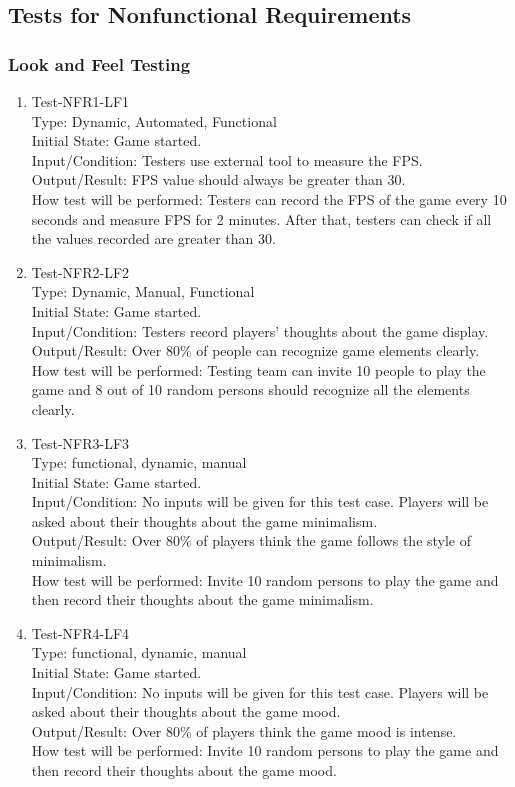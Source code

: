 \documentclass[12pt]{article}
\begin{document}
\subsection{Tests for Nonfunctional Requirements}
\subsubsection{Look and Feel Testing}
\begin{enumerate}[1.]
\item Test-NFR1-LF1\\
Type: Dynamic, Automated, Functional\\
Initial State: Game started.\\
Input/Condition: Testers use external tool to measure
 the FPS.\\
Output/Result: FPS value should always be greater than
30.\\
How test will be performed: Testers can record the FPS
of the game every 10 seconds and measure FPS for 2
minutes. After that, testers can check if all the 
values recorded are greater than 30.
\item Test-NFR2-LF2\\
Type: Dynamic, Manual, Functional\\
Initial State: Game started.\\
Input/Condition: Testers record players' thoughts about 
the game display.\\
Output/Result: Over 80\% of people can recognize 
game elements clearly.\\ 
How test will be performed: Testing team
can invite 10 people to play the game and
8 out of 10 random persons should recognize all the elements clearly.
\item Test-NFR3-LF3\\
Type: functional, dynamic, manual\\
Initial State: Game started.\\
Input/Condition: No inputs will be given for this 
test case. Players will be asked about their thoughts
about the game minimalism.\\
Output/Result: Over 80\% of players think the game
follows the style of minimalism.\\
How test will be performed: Invite 10 random persons to
play the game and then record their thoughts about the
game minimalism.
\item Test-NFR4-LF4\\
Type: functional, dynamic, manual\\
Initial State: Game started.\\
Input/Condition: No inputs will be given for this 
test case. Players will be asked about their thoughts
about the game mood.\\
Output/Result: Over 80\% of players think the game
mood is intense.\\
How test will be performed: Invite 10 random persons to
play the game and then record their thoughts about the
game mood.
\end{enumerate}
\newpage
\end{document}
